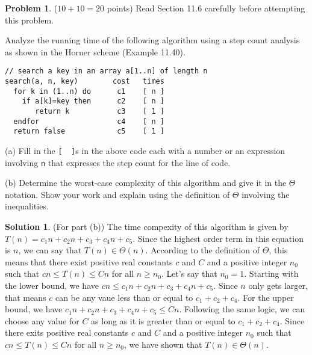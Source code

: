 \documentclass{article}
\theoremstyle{definition}
\newtheorem{problem}{Problem}
\newtheorem*{solution}{Solution}
\begin{document}
\newpage
\begin{problem} ($10+10=20$ points) Read Section 11.6 carefully before attempting 
this problem.

Analyze the running time of the following algorithm using a step count analysis 
as shown in the Horner scheme (Example 11.40).  
\begin{verbatim}
// search a key in an array a[1..n] of length n
search(a, n, key)        cost   times
  for k in (1..n) do      c1    [ n ]   
    if a[k]=key then      c2    [ n ]
       return k           c3    [ 1 ]
  endfor                  c4    [ n ]
  return false            c5    [ 1 ]
\end{verbatim}
(a) Fill in the \verb|[  ]|s in the above code each with a number or an expression involving
\verb|n| that expresses the step count for the line of code.

\medskip
\noindent
(b) Determine the worst-case complexity of this algorithm and give it in the $\Theta$ notation.
Show your work and explain using the definition of $\Theta$ involving the inequalities. 
\end{problem}
\begin{solution} (For part (b))
The time compexity of this algorithm is given by $T(n) = c_1n + c_2n + c_3 + c_4n + c_5$.
Since the highest order term in this equation is $n$, we can say that $T(n) \in \Theta(n)$.
According to the definition of $\Theta$, this means that there exist positive real constants $c$ and $C$
and a positive integer $n_0$ such that $cn \leq T(n) \leq Cn$ for all $n \geq n_0$.
Let's say that $n_0 = 1$.
Starting with the lower bound, we have $cn \leq c_1n + c_2n + c_3 + c_4n + c_5$.
Since $n$ only gets larger, that means $c$ can be any vaue less than or equal to $c_1 + c_2 + c_4$.
For the upper bound, we have $c_1n + c_2n + c_3 + c_4n + c_5 \leq Cn$.
Following the same logic, we can choose any value for $C$ as long as it is greater than or equal to $c_1 + c_2 + c_4$.
Since there exits positive real constants $c$ and $C$ and a positive integer $n_0$ such that $cn \leq T(n) \leq Cn$ for all $n \geq n_0$,
we have shown that $T(n) \in \Theta(n)$.
\end{solution}
\end{document}
